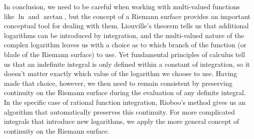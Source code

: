 In conclusion, we need to be careful when working with multi-valued
functions like $\ln$ and $\arctan$, but the concept of a Riemann
surface provides an important conceptual tool for dealing with them.
Liouville's theorem tells us that additional logarithms can be
introduced by integration, and the multi-valued nature of the complex
logarithm leaves us with a choice as to which branch of the function
(or blade of the Riemann surface) to use.  Yet fundamental principles
of calculus tell us that an indefinite integral is only defined within
a constant of integration, so it doesn't matter exactly which value of
the logarithm we choose to use.  Having made that choice, however, we
then need to remain consistent by preserving continuity on the Riemann
surface during the evaluation of any definite integral.  In the
specific case of rational function integration, Rioboo's method gives
us an algorithm that automatically preserves this continuity.  For
more complicated integrals that introduce new logarithms, we apply
the more general concept of continuity on the Riemann surface.

